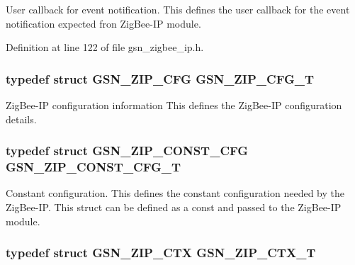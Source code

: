 User callback for event notification. This defines the user callback for the event notification expected fron ZigBee-\/IP module. 



Definition at line 122 of file gsn\_\-zigbee\_\-ip.h.

\hypertarget{a00618_a56f802e85cf43a69e675b750a87f9c2c}{
\subsubsection[{GSN\_\-ZIP\_\-CFG\_\-T}]{\setlength{\rightskip}{0pt plus 5cm}typedef struct {\bf GSN\_\-ZIP\_\-CFG} {\bf GSN\_\-ZIP\_\-CFG\_\-T}}}
\label{a00618_a56f802e85cf43a69e675b750a87f9c2c}


ZigBee-\/IP configuration information This defines the ZigBee-\/IP configuration details. 

\hypertarget{a00618_adb1586a8cb312762accc1ffe2fb65c0e}{
\subsubsection[{GSN\_\-ZIP\_\-CONST\_\-CFG\_\-T}]{\setlength{\rightskip}{0pt plus 5cm}typedef struct {\bf GSN\_\-ZIP\_\-CONST\_\-CFG} {\bf GSN\_\-ZIP\_\-CONST\_\-CFG\_\-T}}}
\label{a00618_adb1586a8cb312762accc1ffe2fb65c0e}


Constant configuration. This defines the constant configuration needed by the ZigBee-\/IP. This struct can be defined as a const and passed to the ZigBee-\/IP module. 

\hypertarget{a00618_aa7ad02729e7d464fd05afdcc923ff390}{
\subsubsection[{GSN\_\-ZIP\_\-CTX\_\-T}]{\setlength{\rightskip}{0pt plus 5cm}typedef struct {\bf GSN\_\-ZIP\_\-CTX} {\bf GSN\_\-ZIP\_\-CTX\_\-T}}}
\label{a00618_aa7ad02729e7d464fd05afdcc923ff390}



